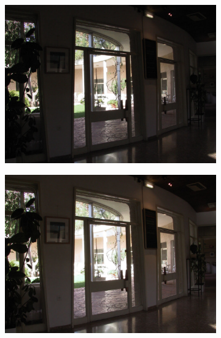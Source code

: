 \begin{figure}
\begin{subfigure}[b]{0.33\textwidth}
    \includegraphics[width=\textwidth]{figures/chapter2/exposure/bh5.jpg}
\end{subfigure}\hfill
\begin{subfigure}[b]{0.33\textwidth}
    \centering
    \includegraphics[width=\textwidth]{figures/chapter2/exposure/bh6.jpg}
\end{subfigure}\\
\begin{subfigure}[b]{0.33\textwidth}
    \centering

\end{subfigure}
\end{figure}
